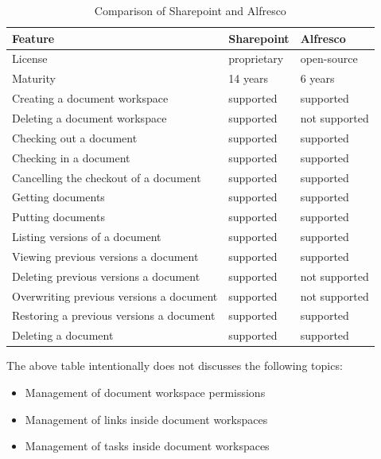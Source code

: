 \begin{table}[H]
  \begin{center}
    \begin{tabular}{| l | l | l |}
    \hline
    \textbf{Feature} & \textbf{Sharepoint} & \textbf{Alfresco} \\ \hline
    License & proprietary & open-source \\ \hline
    Maturity & 14 years\cite{sphist} & 6 years \\ \hline
    Creating a document workspace & supported & supported \\ \hline
    Deleting a document workspace & supported & not supported \\ \hline
    Checking out a document & supported & supported \\ \hline
    Checking in a document & supported & supported \\ \hline
    Cancelling the checkout of a document & supported & supported \\ \hline
    Getting documents & supported & supported \\ \hline
    Putting documents & supported & supported \\ \hline
    Listing versions of a document & supported & supported \\ \hline
    Viewing previous versions a document & supported & supported \\ \hline
    Deleting previous versions a document & supported & not supported \\ \hline
    Overwriting previous versions a document & supported & not supported \\ \hline
    Restoring a previous versions a document & supported & supported \\ \hline
    Deleting a document & supported & supported \\ \hline
    \end{tabular}
  \end{center}
  \caption{Comparison of Sharepoint and Alfresco}
  \label{tab:background-comparison}
\end{table}

The above table intentionally does not discusses the following topics:

\begin{itemize}
\item Management of document workspace permissions
\item Management of links inside document workspaces
\item Management of tasks inside document workspaces
\end{itemize}

